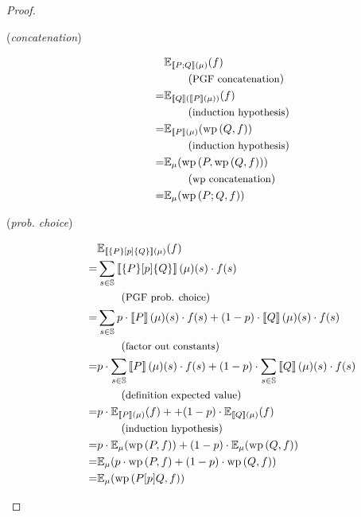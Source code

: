 \begin{theorem}
\begin{proof}
\begin{description}
			\item[(\textit{concatenation})] \begin{align*}
				  & \E_{\smtx{P;Q}(\mu)} (f) \\
				  & \explain{PGF concatenation} \\
				= & \E_{\smtx{Q}(\smtx{P}(\mu))} (f) \\
				  & \explain{induction hypothesis} \\
				= & \E_{\smtx{P}(\mu)} (\wp{Q, f}) \\
				  & \explain{induction hypothesis} \\
				= & \E_\mu (\wp{P, \wp{Q, f}}) \\
				& \explain{wp concatenation} \\
				= & \E_\mu (\wp{P;Q, f})
			\end{align*}
			
			\item[(\textit{prob. choice})] \begin{align*}
				  & \E_{ \smtx{\{P\}[p]\{Q\}}(\mu) } (f) \\
				= & \sum_{s \in \S} \smtx{\{P\}[p]\{Q\}}(\mu)(s) \cdot f(s) \\
				  & \explain{PGF prob. choice} \\
				= & \sum_{s \in \S} p \cdot \smtx{P}(\mu)(s) \cdot f(s)
					+ (1-p) \cdot \smtx{Q}(\mu)(s) \cdot f(s) \\
				  & \explain{factor out constants} \\
				= & p \cdot \sum_{s \in \S} \smtx{P}(\mu)(s) \cdot f(s)
					+ (1-p) \cdot \sum_{s \in \S} \smtx{Q}(\mu)(s) \cdot f(s) \\
				  & \explain{definition expected value} \\
				= & p \cdot \E_{ \smtx{P}(\mu) } (f)+
					+ (1-p) \cdot \E_{ \smtx{Q}(\mu) } (f) \\
				  & \explain{induction hypothesis} \\
				= & p \cdot \E_\mu (\wp{P, f}) + (1-p) \cdot \E_\mu (\wp{Q, f}) \\
				= & \E_\mu (p \cdot \wp{P, f} + (1-p) \cdot \wp{Q, f}) \\
				= & \E_\mu (\wp{P[p]Q, f})
			\end{align*}
			

\end{description}
\end{proof}
\end{theorem}
